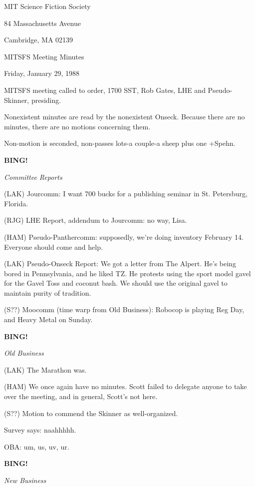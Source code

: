 \documentclass[12pt]{article}
\newcommand{\bing}{{\bf BING!} }
\newcommand{\goto}[1]{\bing \vskip 12pt \centerline{{\em{#1}}}}
\begin{document}
\begin{center}

MIT Science Fiction Society 

84 Massachusetts Avenue

Cambridge, MA 02139

\vspace{12pt}

MITSFS Meeting Minutes 

Friday, January 29, 1988

\end{center}
 
\vspace{18pt}

\setlength{\parskip}{6pt}

\noindent
MITSFS meeting called to order, 1700 SST,
Rob Gates, LHE and Pseudo-Skinner, presiding.

Nonexistent minutes are read by the nonexistent Onseck. Because there are no minutes, there are no motions concerning them.

Non-motion is seconded, non-passes lots-a couple-a sheep plus one +Spehn.

\goto{Committee Reports}

(LAK) Jourcomm: I want 700 bucks for a publishing seminar in St. Petersburg, Florida.

(RJG) LHE Report, addendum to Jourcomm: no way, Lisa.

(HAM) Pseudo-Panthercomm: supposedly, we're doing inventory February 14. Everyone should come and help.

(LAK) Pseudo-Onseck Report: We got a letter from The Alpert. He's being bored in Pennsylvania, and he liked TZ. He protests using the sport model gavel for the Gavel Toss and coconut bash. We should use the original gavel to maintain purity of tradition.

(S??) Moocomm (time warp from Old Business): Robocop is playing Reg Day, and Heavy Metal on Sunday.

\goto{Old Business}

(LAK) The Marathon was.

(HAM) We once again have no minutes. Scott failed to delegate anyone to take over the meeting, and in general, Scott's not here.

(S??) Motion to commend the Skinner as well-organized.

Survey says: naahhhhh.

OBA: um, us, uv, ur.

\goto{New Business}
\end{document}
